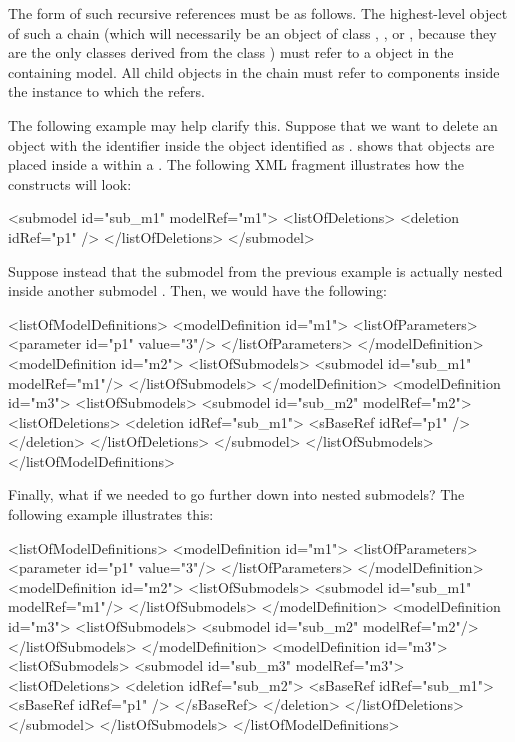 The form of such recursive references must be as follows.  The
highest-level \SBaseRef object of such a chain (which will necessarily
be an object of class \Port, \Deletion, \ReplacedElement or \ReplacedBy,
because they are the only classes derived from the class \SBaseRef) must
refer to a \Submodel object in the containing model.  All child
\SBaseRef objects in the chain must refer to components inside the
\Model instance to which the \Submodel refers.

The following example may help clarify this.  Suppose that we want to
delete an object with the identifier  inside the \Submodel
object identified as .   shows that \Deletion
objects are placed inside a \ListOfDeletions within a \Submodel.  The 
following XML fragment illustrates how the constructs will look:

\begin{example}
<submodel id="sub_m1" modelRef="m1">
  <listOfDeletions>
    <deletion idRef="p1" />
  </listOfDeletions>
</submodel>
\end{example}

Suppose instead that the submodel  from the previous example is
actually nested inside another submodel .  Then, we would have
the following:

\begin{example}
<listOfModelDefinitions>
  <modelDefinition id="m1">
    <listOfParameters>
      <parameter id="p1" value="3"/>
    </listOfParameters>
  </modelDefinition>
  <modelDefinition id="m2">
    <listOfSubmodels>
      <submodel id="sub_m1" modelRef="m1"/>
    </listOfSubmodels>    
  </modelDefinition>
  <modelDefinition id="m3">
    <listOfSubmodels>
      <submodel id="sub_m2" modelRef="m2">
        <listOfDeletions>
          <deletion idRef="sub_m1">
            <sBaseRef idRef="p1" />
          </deletion>
        </listOfDeletions>
      </submodel>
    </listOfSubmodels>    
</listOfModelDefinitions>
\end{example}

Finally, what if we needed to go further down into nested submodels?
The following example illustrates this:

\begin{example}
<listOfModelDefinitions> 
  <modelDefinition id="m1"> 
    <listOfParameters> 
      <parameter id="p1" value="3"/> 
    </listOfParameters> 
  </modelDefinition> 
  <modelDefinition id="m2"> 
    <listOfSubmodels> 
      <submodel id="sub_m1" modelRef="m1"/> 
    </listOfSubmodels>     
  </modelDefinition> 
  <modelDefinition id="m3"> 
    <listOfSubmodels> 
      <submodel id="sub_m2" modelRef="m2"/> 
    </listOfSubmodels>     
  </modelDefinition> 
  <modelDefinition id="m3"> 
    <listOfSubmodels> 
      <submodel id="sub_m3" modelRef="m3"> 
        <listOfDeletions> 
          <deletion idRef="sub_m2"> 
            <sBaseRef idRef="sub_m1"> 
              <sBaseRef idRef="p1" />
            </sBaseRef> 
          </deletion> 
        </listOfDeletions> 
      </submodel> 
    </listOfSubmodels>     
</listOfModelDefinitions> 
\end{example}


